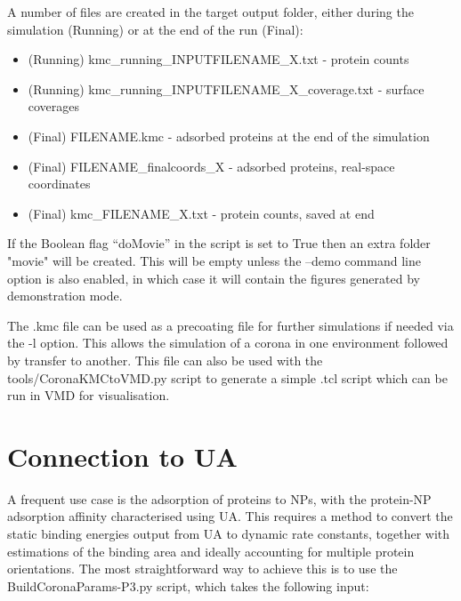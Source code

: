 \documentclass[10pt,a4paper,onecolumn]{report}
\begin{document}
A number of files are created in the target output folder, either during the simulation (Running) or at the end of the run (Final):
\begin{itemize}
\item (Running) kmc\_running\_INPUTFILENAME\_X.txt - protein counts
\item (Running) kmc\_running\_INPUTFILENAME\_X\_coverage.txt - surface coverages
\item (Final) FILENAME.kmc - adsorbed proteins at the end of the simulation
\item (Final) FILENAME\_finalcoords\_X - adsorbed proteins, real-space coordinates
\item (Final) kmc\_FILENAME\_X.txt - protein counts, saved at end
\end{itemize}

If the Boolean flag ``doMovie'' in the script is set to True then an extra folder "movie" will be created. This will be empty unless the --demo command line option is also enabled, in which case it will contain the figures generated by demonstration mode.

The .kmc file can be used as a precoating file for further simulations if needed via the -l option. This allows the simulation of a corona in one environment followed by transfer to another.  This file can also be used with the tools/CoronaKMCtoVMD.py script to generate a simple .tcl script which can be run in VMD for visualisation.


\section{Connection to UA}
A frequent use case is the adsorption of proteins to NPs, with the protein-NP adsorption affinity characterised using UA. This requires a method to convert the static binding energies output from UA to dynamic rate constants, together with estimations of the binding area and ideally accounting for multiple protein orientations. The most straightforward way to achieve this is to use the BuildCoronaParams-P3.py script, which takes the following input:
\end{document}
